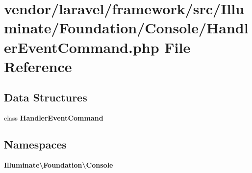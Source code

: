 \section{vendor/laravel/framework/src/\+Illuminate/\+Foundation/\+Console/\+Handler\+Event\+Command.php File Reference}
\label{_handler_event_command_8php}
\subsection*{Data Structures}
\begin{DoxyCompactItemize}
\item 
class {\bf Handler\+Event\+Command}
\end{DoxyCompactItemize}
\subsection*{Namespaces}
\begin{DoxyCompactItemize}
\item 
 {\bf Illuminate\textbackslash{}\+Foundation\textbackslash{}\+Console}
\end{DoxyCompactItemize}
